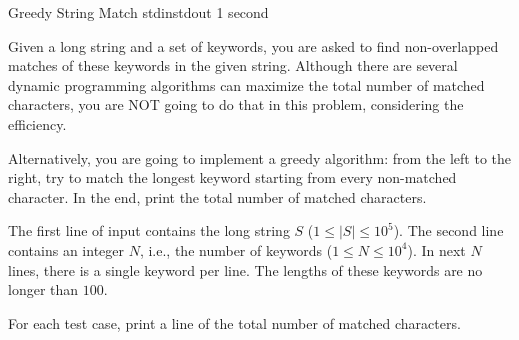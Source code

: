 \begin{problem}{Greedy String Match}
{stdin}{stdout}
{1 second}{}{}

Given a long string and a set of keywords, you are asked to find non-overlapped matches of these keywords in the given string.
Although there are several dynamic programming algorithms can maximize the total number of matched characters, you are NOT going to do that in this problem, considering the efficiency.

Alternatively, you are going to implement a greedy algorithm: from the left to the right, try to match the longest keyword starting from every non-matched character.
In the end, print the total number of matched characters.

\InputFile

The first line of input contains the long string $S$ ($1 \le |S| \le 10^5$).
The second line contains an integer $N$, i.e., the number of keywords ($1 \le N \le 10^4$).
In next $N$ lines, there is a single keyword per line. 
The lengths of these keywords are no longer than $100$.

\OutputFile

For each test case, print a line of the total number of matched characters.

\Examples

\begin{example}
%
%
\end{example}

\end{problem}
